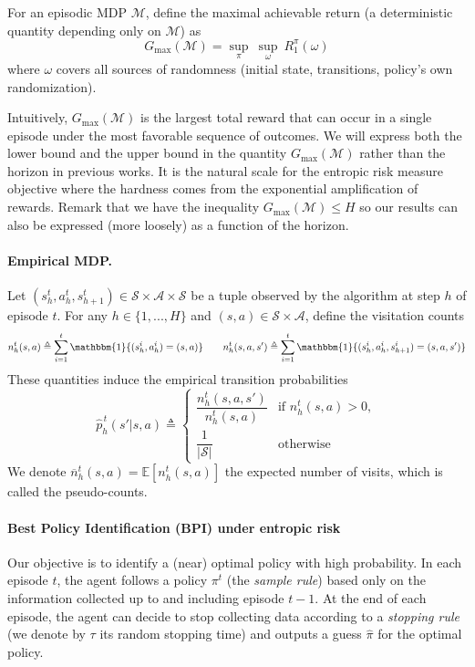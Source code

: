 \documentclass[final,12pt]{colt2026} %
\begin{document}
\begin{definition}\label{Gmax}
For an episodic MDP $\mathcal{M}$, 
define the maximal achievable return (a deterministic quantity depending only on $\mathcal{M}$) as
$$
G_{\max}(\mathcal{M}) = \sup_{\pi}\ \sup_{\omega}\ R_1^\pi(\omega)
$$
where $\omega$ covers all sources of randomness (initial state, transitions, policy’s own randomization).
\end{definition}
Intuitively, $G_{\max}(\mathcal{M})$ is the largest total reward that can occur in a single episode under the most favorable sequence of outcomes. We will express both the lower bound and the upper bound in the quantity $G_{\max}(\mathcal{M})$ rather than the horizon in previous works. It is the natural scale for the entropic risk measure objective where the hardness comes from the exponential amplification of rewards. Remark that we have the inequality $G_{\max}(\mathcal{M}) \leq H$ so our results can also be expressed (more loosely) as a function of the horizon.

 \paragraph{\textbf{Empirical MDP.}}
Let $(s_h^t, a_h^t, s_{h+1}^t)\in \mathcal{S}\times\mathcal{A}\times \mathcal{S}$ be a tuple observed by the algorithm at step $h$ of episode $t$.
For any $h \in \{1,...,H\}$ and $(s,a)\in \mathcal{S}\times\mathcal{A}$, define the visitation counts
$$
n_h^t(s,a) \triangleq \sum_{i=1}^{t} \mathbbm{1}\{(s_h^i,a_h^i)=(s,a)\}
\qquad
n_h^t(s,a,s') \triangleq \sum_{i=1}^{t} \mathbbm{1}\{(s_h^i,a_h^i,s_{h+1}^i)=(s,a,s')\}
$$
These quantities induce the empirical transition probabilities
$$
\widehat{p}_h^{\,t}(s' | s,a) \triangleq
\begin{cases}
\dfrac{n_h^t(s,a,s')}{n_h^t(s,a)} & \text{if } n_h^t(s,a)>0,\\[6pt]
\dfrac{1}{|\mathcal{S}|} & \text{otherwise}
\end{cases}
$$
We denote $\overline{n}_h^t(s,a) = \mathbb{E}[n_h^t(s,a)]$ the expected number of visits, which is called the pseudo-counts.


\paragraph{Best Policy Identification (BPI) under entropic risk}
Our objective is to identify a (near) optimal policy with high probability. In each episode $t$, the agent follows a policy $\pi^{t}$ (the \emph{sample rule}) based only on the information collected up to and including episode $t-1$. 
At the end of each episode, the agent can decide to stop collecting data according to a \emph{stopping rule} (we denote by $\tau$ its random stopping time) and outputs a guess $\hat{\pi}$ for the optimal policy.
\end{document}
